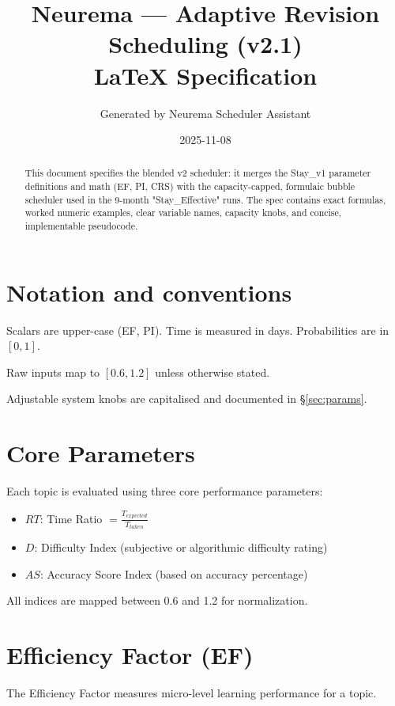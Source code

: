 \documentclass[11pt]{article}
\title{Neurema — Adaptive Revision Scheduling (v2.1)\\LaTeX Specification}
\author{Generated by Neurema Scheduler Assistant}
\date{2025-11-08}
\begin{document}
\maketitle
\begin{abstract}
This document specifies the blended v2 scheduler: it merges the Stay\_v1 parameter definitions and math (EF, PI, CRS) with the capacity-capped, formulaic bubble scheduler used in the 9-month "Stay\_Effective" runs. The spec contains exact formulas, worked numeric examples, clear variable names, capacity knobs, and concise, implementable pseudocode.
\end{abstract}

\section{Notation and conventions}
\begin{description}[leftmargin=!,labelwidth=3cm]
  \item[Indices] Scalars are upper-case (EF, PI). Time is measured in days. Probabilities are in $[0,1]$.
  \item[Normalization] Raw inputs map to $[0.6,1.2]$ unless otherwise stated.
  \item[Constants] Adjustable system knobs are capitalised and documented in \S\ref{sec:params}.
\end{description}
\section{Core Parameters}
Each topic is evaluated using three core performance parameters:

\begin{itemize}
\item \( RT \): Time Ratio \( = \frac{T_{expected}}{T_{taken}} \)
\item \( D \): Difficulty Index (subjective or algorithmic difficulty rating)
\item \( AS \): Accuracy Score Index (based on accuracy percentage)
\end{itemize}

All indices are mapped between 0.6 and 1.2 for normalization.

\section{Efficiency Factor (EF)}
The Efficiency Factor measures micro-level learning performance for a topic.
\end{document}
